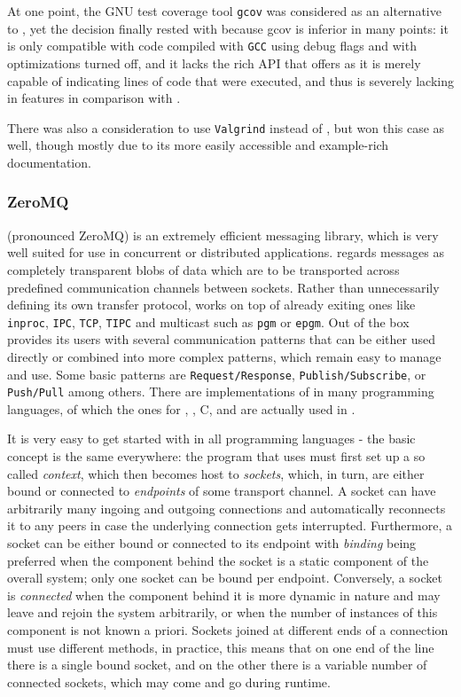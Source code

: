 At one point, the GNU test coverage tool \texttt{gcov}\cite{gcov} was considered as an alternative to 
\pin, yet the decision finally rested with \pin because gcov is inferior in many points: it is only
compatible with code compiled with \texttt{GCC} using debug flags and with optimizations turned off, and it
lacks the rich API that \pin offers as it is merely capable of indicating lines of code that were executed, and
thus is severely lacking in features in comparison with \pin.

There was also a consideration to use \texttt{Valgrind}\cite{Nethercote03valgrind:a} instead of \pin, but \pin
won this case as well, though mostly due to its more easily accessible and example-rich documentation. 
\tocless\subsubsection{ZeroMQ}
\label{sec:zmq}
\zmq{}\cite{zmq} (pronounced {\small ZeroMQ}) is an extremely efficient messaging library, 
which is very well suited for use in concurrent or distributed applications. \zmq regards messages as 
completely transparent blobs of data which are to be transported across predefined communication channels 
between sockets. Rather than unnecessarily defining its own transfer protocol, \zmq works on top of already exiting 
ones like \texttt{inproc}, \texttt{IPC}, \texttt{TCP}, \texttt{TIPC} and multicast such as \texttt{pgm} or \texttt{epgm}.
Out of the box \zmq provides its users with several communication patterns that can be either used directly or combined 
into more complex patterns, which remain easy to manage and use. Some basic patterns are \texttt{Request/Response}, 
\texttt{Publish/Subscribe}, or \texttt{Push/Pull} among others.
There are implementations of \zmq in many programming languages, of which the ones for \java, \python, {\small C}, 
and \cpp are actually used in \xmlmate. 

It is very easy to get started with \zmq in all programming languages - the basic concept is the
same everywhere: the program that uses \zmq must first set up a so called \emph{context}, which then becomes
host to \emph{sockets}, which, in turn, are either bound or connected to \emph{endpoints} of some transport
channel. A socket can have arbitrarily many ingoing and outgoing connections and \zmq automatically reconnects
it to any peers in case the underlying connection gets interrupted. Furthermore, a socket can be either bound
or connected to its endpoint with \emph{binding} being preferred when the component behind the socket is a
static component of the overall system; only one socket can be bound per endpoint. Conversely, a socket is
\emph{connected} when the component behind it is more dynamic in nature and may leave and rejoin the system
arbitrarily, or when the number of instances of this component is not known a priori. Sockets joined at
different ends of a connection must use different methods, in practice, this means that on one end of the line
there is a single bound socket, and on the other there is a variable number of connected sockets, which may
come and go during runtime.

